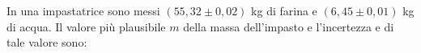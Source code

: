 In una impastatrice sono messi $(55,32 \pm 0,02)$ kg di farina 
e $(6,45 \pm 0,01)$ kg di acqua. Il valore più plausibile $m$ 
della massa dell'impasto e l'incertezza e di tale valore 
sono: